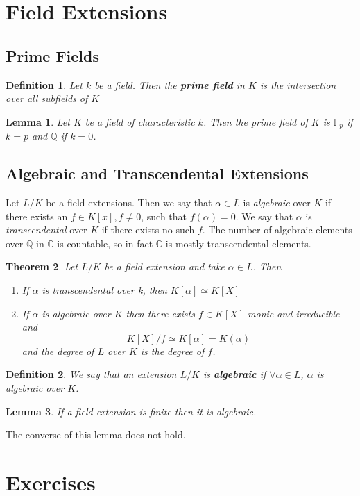 \documentclass{article}
\newcommand{\C}{\mathbb{C}}
\newcommand{\Q}{\mathbb{Q}}
\newtheorem{theorem}{Theorem}[section]
\newtheorem{lemma}[theorem]{Lemma}
\newtheorem*{definition}{Definition}
\theoremstyle{remark}
\begin{document}
    \section{Field Extensions}
    \subsection{Prime Fields}
    \begin{definition}
        Let $k$ be a field. Then the \textbf{prime field} in $K$ is the intersection over all subfields of $K$
    \end{definition}
    \begin{lemma}
        Let $K$ be a field of characteristic $k$. Then the prime field of $K$ is $\mathbb{F}_p$ if $k=p$ and $\Q$ if $k=0$.
    \end{lemma}
    \subsection{Algebraic and Transcendental Extensions}
    Let $L/K$ be a field extensions. Then we say that $\alpha\in L $ is \textit{algebraic} over $K$ if there exists an $f\in K[x], f\neq 0$, such that $f(\alpha)=0$.
    We say that $\alpha$ is \textit{transcendental} over $K$ if there exists no such $f$.
    The number of algebraic elements over $\Q$ in $\C$ is countable, so in fact $\C$ is mostly transcendental elements.

    \begin{theorem}
        Let $L/K$ be a field extension and take $\alpha\in L$. Then
        \begin{enumerate}
            \item If $\alpha$ is transcendental over k, then $K[\alpha]\simeq K[X]$
            \item If $\alpha$ is algebraic over $K$ then there exists $f\in K[X]$ monic and irreducible and
                $$ K[X]/f\simeq K[\alpha]=K(\alpha)$$
                and the degree of $L$ over $K$ is the degree of $f$.
        \end{enumerate}
    \end{theorem}

    \begin{definition}
        We say that an extension $L/K$ is \textbf{algebraic} if $\forall \alpha\in L$, $\alpha$ is algebraic over $K$.
    \end{definition}
    \begin{lemma}
        If a field extension is finite then it is algebraic.
    \end{lemma}
    The converse of this lemma does not hold.

    \newpage
    \section{Exercises}
    
\end{document}
